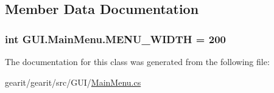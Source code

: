 \subsection{Member Data Documentation}
\hypertarget{class_g_u_i_1_1_main_menu_acc4b53f22a7538aa0b5708ad5d2a73ce}{
\subsubsection[{M\+E\+N\+U\+\_\+\+W\+I\+D\+T\+H}]{\setlength{\rightskip}{0pt plus 5cm}int G\+U\+I.\+Main\+Menu.\+M\+E\+N\+U\+\_\+\+W\+I\+D\+T\+H = 200\hspace{0.3cm}{\ttfamily [static]}}}\label{class_g_u_i_1_1_main_menu_acc4b53f22a7538aa0b5708ad5d2a73ce}


The documentation for this class was generated from the following file\+:\begin{DoxyCompactItemize}
\item 
gearit/gearit/src/\+G\+U\+I/\hyperlink{_g_u_i_2_main_menu_8cs}{Main\+Menu.\+cs}\end{DoxyCompactItemize}

